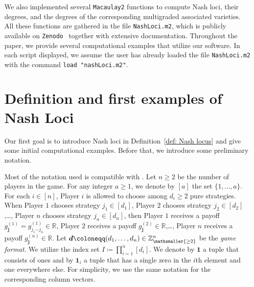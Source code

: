 \documentclass[12pt]{article}
\theoremstyle{definition}
\newcommand*{\mge}[1][]{\mathsmaller{\ge #1}}
\newcommand{\R}{{\mathbb R}}
\newcommand{\Z}{{\mathbb Z}}
\def\bj{{\boldsymbol{j}}}
\def\bd{{\boldsymbol{d}}}
\def\bone{{\boldsymbol{1}}}
\begin{document}
\medskip

We also implemented several \texttt{Macaulay2} \cite{grayson1997macaulay2} functions to compute Nash loci, their degrees, and the degrees of the corresponding multigraded associated varieties. All these functions are gathered in the file {\tt NashLoci.m2}, which is publicly available on {\tt Zenodo}~\cite{sodomaco2026supplementary} together with extensive documentation. Throughout the paper, we provide several computational examples that utilize our software. In each script displayed, we assume the user has already loaded the file {\tt NashLoci.m2} with the command {\tt load "nashLoci.m2"}.

\section{Definition and first examples of Nash Loci}\label{sec: definition}

Our first goal is to introduce Nash loci in Definition~\ref{def: Nash locus} and give some initial computational examples. Before that, we introduce some preliminary notation.

\medskip

Most of the notation used is compatible with \cite{abo2026vector}. Let $n\ge 2$ be the number of players in the game. For any integer $a\ge 1$, we denote by $[a]$ the set $\{1,\ldots,a\}$. For each $i\in[n]$, Player $i$ is allowed to choose among $d_i\ge 2$ pure strategies. When Player $1$ chooses strategy $j_1\in[d_1]$, Player $2$ chooses strategy $j_2\in[d_2]$,\ldots, Player $n$ chooses strategy $j_n\in[d_n]$, then Player $1$ receives a payoff $g_{\bj}^{(1)}=g_{j_1\cdots j_n}^{(1)}\in\R$, Player $2$ receives a payoff $g_{\bj}^{(2)}\in\R$,\ldots, Player $n$ receives a payoff $g_{\bj}^{(n)}\in\R$.
Let $\bd\coloneqq(d_1,\ldots,d_n)\in\Z_{\mge[2]}^n$ be the {\em game format}. We utilize the index set $I\coloneqq\prod_{i=1}^n[d_i]$.
We denote by $\bone$ a tuple that consists of ones and by $\bone_i$ a tuple that has a single zero in the $i$th element and one everywhere else. For simplicity, we use the same notation for the corresponding column vectors.

\medskip
\end{document}
